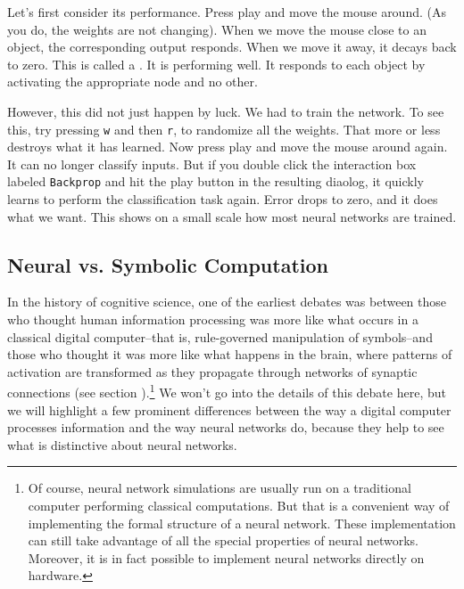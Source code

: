 Let's first consider its performance. Press play and move the mouse around. (As you do, the weights are not changing). When we move the mouse close to an object, the corresponding output responds.  When we move it away, it decays back to zero.  This is called a . It is performing well.  It responds to each object by activating the appropriate node and no other.

However, this did not just happen by luck. We had to train the network. To see this, try pressing \texttt{w} and then \texttt{r}, to randomize all the weights. That more or less destroys what it has learned. Now press play and move the mouse around again. It can no longer classify inputs. But if you double click the interaction box labeled \texttt{Backprop} and hit the play button in the resulting diaolog, it quickly learns to perform the classification task again. Error drops to zero, and it does what we want. This shows on a small scale how most neural networks are trained.

\subsection{Neural vs. Symbolic Computation}\label{classicalAIComparison}

In the history of cognitive science, one of the earliest debates was between those who thought human information processing was more like what occurs in a classical digital computer--that is, rule-governed manipulation of symbols--and those who thought it was more like what happens in the brain, where patterns of activation are transformed as they propagate through networks of synaptic connections (see section ).\footnote{Of course, neural network simulations are usually run on a traditional computer performing classical computations. But that is a convenient way of implementing the formal structure of a neural network. These implementation can still take advantage of all the special properties of neural networks. Moreover, it is in fact possible to implement neural networks directly on hardware.} We won't go into the details of this debate here, but we will highlight a few prominent differences between the way a digital computer processes information and the way neural networks do, because they help to see what is distinctive about neural networks.

